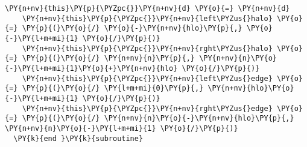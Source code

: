 \begin{Verbatim}[commandchars=\\\{\}]
    \PY{n+nv}{this}\PY{p}{\PYZpc{}}\PY{n+nv}{d} \PY{o}{=} \PY{n+nv}{d}
    \PY{n+nv}{this}\PY{p}{\PYZpc{}}\PY{n+nv}{left\PYZus{}halo} \PY{o}{=} \PY{p}{(}\PY{o}{/} \PY{o}{-}\PY{n+nv}{hlo}\PY{p}{,} \PY{o}{-}\PY{l+m+mi}{1} \PY{o}{/}\PY{p}{)} 
    \PY{n+nv}{this}\PY{p}{\PYZpc{}}\PY{n+nv}{rght\PYZus{}halo} \PY{o}{=} \PY{p}{(}\PY{o}{/} \PY{n+nv}{n}\PY{p}{,} \PY{n+nv}{n}\PY{o}{-}\PY{l+m+mi}{1}\PY{o}{+}\PY{n+nv}{hlo} \PY{o}{/}\PY{p}{)} 
    \PY{n+nv}{this}\PY{p}{\PYZpc{}}\PY{n+nv}{left\PYZus{}edge} \PY{o}{=} \PY{p}{(}\PY{o}{/} \PY{l+m+mi}{0}\PY{p}{,} \PY{n+nv}{hlo}\PY{o}{-}\PY{l+m+mi}{1} \PY{o}{/}\PY{p}{)}
    \PY{n+nv}{this}\PY{p}{\PYZpc{}}\PY{n+nv}{rght\PYZus{}edge} \PY{o}{=} \PY{p}{(}\PY{o}{/} \PY{n+nv}{n}\PY{o}{-}\PY{n+nv}{hlo}\PY{p}{,} \PY{n+nv}{n}\PY{o}{-}\PY{l+m+mi}{1} \PY{o}{/}\PY{p}{)}
  \PY{k}{end }\PY{k}{subroutine}


\end{Verbatim}
